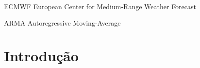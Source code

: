 \documentclass[
	12pt,				%
	openright,			%
	oneside,			%
	a4paper,			%
	english,			%
	french,				%
	spanish,			%
	brazil				%
	]{abntex2}
\begin{document}
\begin{siglas}
  \item[ECMWF] European Center for Medium-Range Weather Forecast
  \item[ARMA] Autoregressive Moving-Average
\end{siglas}


\tableofcontents*



\textual

\chapter*[Introdução]{Introdução}

\end{document}
